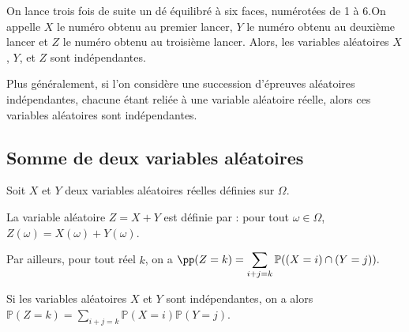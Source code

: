 \documentclass[11pt,fleqn, openany]{book} %
\begin{document}
\begin{example}On lance trois fois de suite un dé équilibré à six faces, numérotées de 1 à 6.On appelle $X$ le numéro obtenu au premier lancer, $Y$ le numéro obtenu au deuxième lancer et $Z$ le numéro obtenu au troisième lancer. Alors, les variables aléatoires $X$, $Y$, et $Z$ sont indépendantes.

Plus généralement, si l'on considère une succession d'épreuves aléatoires indépendantes, chacune étant reliée à une variable aléatoire réelle, alors ces variables aléatoires sont indépendantes.\end{example}



\subsection{Somme de deux variables aléatoires}


\begin{definition}Soit $X$ et $Y$ deux variables aléatoires réelles définies sur $\Omega$. 

La variable aléatoire $Z=X+Y$ est définie par : pour tout $\omega \in \Omega$,  $Z(\omega) =  X(\omega) + Y(\omega)$.

Par ailleurs, pour tout réel $k$, on a $\pp(Z=k) = \displaystyle \sum_{i+j=k} \mathbb{P}((X=i) \cap (Y=j)).$

Si les variables aléatoires $X$ et $Y$ sont indépendantes, on a alors $\mathbb{P}(Z=k)=\displaystyle\sum_{i+j=k} \mathbb{P}(X=i) \mathbb{P}(Y=j)$.\end{definition}
\end{document}
